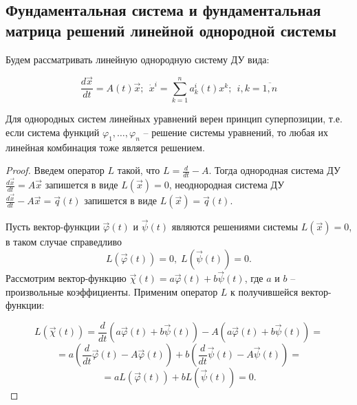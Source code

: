 \subsection{Фундаментальная система и фундаментальная матрица решений линейной однородной
системы}

Будем рассматривать линейную однородную систему ДУ вида:

\begin{equation}
    \frac{d \overrightarrow x}{dt} = A(t) \overrightarrow x; ~~ \dot x^i = \sum^n_{k = 1} a^i_k(t) x^k; ~~ i, k = \overline{1, n}
    \label{4_2_lin_syst}
\end{equation}

\begin{proposition}
    Для однородных систем линейных уравнений верен принцип суперпозиции, т.е. если
    система функций $\varphi_1, \dots, \varphi_n$ -- решение системы уравнений, то любая их линейная комбинация тоже
    является решением.
\end{proposition}
\begin{proof}

    Введем оператор $L$ такой, что $L = \frac{d}{dt} - A$. Тогда однородная система ДУ $\frac{d \overrightarrow x}{dt} = A \overrightarrow x$ запишется в виде $L(\overrightarrow x) = 0$, неоднородная система ДУ $\frac{d \overrightarrow x}{dt} - A \overrightarrow x = \overrightarrow{q}(t)$ запишется в виде $L(\overrightarrow x) = \overrightarrow{q}(t)$.

    Пусть вектор-функции $\overrightarrow{\varphi}(t)$ и $\overrightarrow{\psi}(t)$ являются решениями системы $L(\overrightarrow x) = 0$, в таком случае справедливо
    \[ L(\overrightarrow{\varphi}(t)) = 0, \; L(\overrightarrow{\psi}(t)) = 0. \]
    Рассмотрим вектор-функцию $\overrightarrow{\chi}(t) = a \overrightarrow{\varphi}(t) + b \overrightarrow{\psi}(t)$, где $a$ и $b$ --  произвольные коэффициенты. Применим оператор $L$ к получившейся вектор-функции:
    
    \[ L(\overrightarrow{\chi}(t)) = \frac{d}{dt} \left(a \overrightarrow{\varphi}(t) + b \overrightarrow{\psi}(t) \right) - A \left(a \overrightarrow{\varphi}(t) + b \overrightarrow{\psi}(t) \right) = \]
    \[ = a \left(\frac{d}{dt} \overrightarrow{\varphi}(t) - A \overrightarrow{\varphi}(t) \right) + b \left(\frac{d}{dt} \overrightarrow{\psi}(t) - A \overrightarrow{\psi}(t) \right) = \]
    \[ = a L(\overrightarrow{\varphi}(t)) + b L(\overrightarrow{\psi}(t)) = 0. \]

\end{proof}

